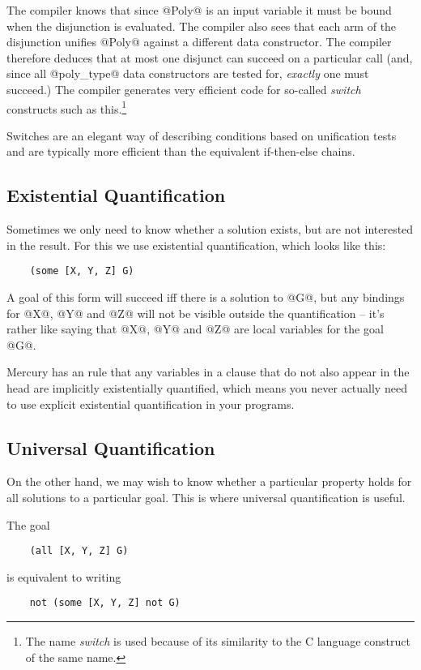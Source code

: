 \documentclass[a4paper,11pt,notitlepage,onecolumn]{article}
\begin{document}
The compiler knows that since @Poly@ is an input variable it
must be bound when the disjunction is evaluated.  The compiler
also sees that each arm of the disjunction unifies @Poly@
against a different data constructor.  The compiler therefore
deduces that at most one disjunct can succeed on a particular
call (and, since all @poly_type@ data constructors are tested
for, \emph{exactly} one must succeed.)  The compiler generates very
efficient code for so-called \emph{switch} constructs such as this.\footnote{The name \emph{switch} is used because of its similarity
to the C language construct of the same name.}

Switches are an elegant way of describing conditions based on
unification tests and are typically more efficient than the
equivalent if-then-else chains.

\subsection{Existential Quantification}

Sometimes we only need to know whether a solution exists, but
are not interested in the result.  For this we use existential
quantification, which looks like this:
\begin{verbatim}
    (some [X, Y, Z] G)
\end{verbatim}
A goal of this form will succeed iff there is a solution to @G@,
but any bindings for @X@, @Y@ and @Z@ will not be visible outside
the quantification -- it's rather like saying that @X@, @Y@ and @Z@ 
are local variables for the goal @G@.

Mercury has an rule that any variables in a clause that do not
also appear in the head are implicitly existentially
quantified, which means you never actually need to use
explicit existential quantification in your programs.

\subsection{Universal Quantification}

On the other hand, we may wish to know whether a particular
property holds for all solutions to a particular goal.  This
is where universal quantification is useful.

The goal
\begin{verbatim}
    (all [X, Y, Z] G)
\end{verbatim}
is equivalent to writing
\begin{verbatim}
    not (some [X, Y, Z] not G)
\end{verbatim}
\end{document}
